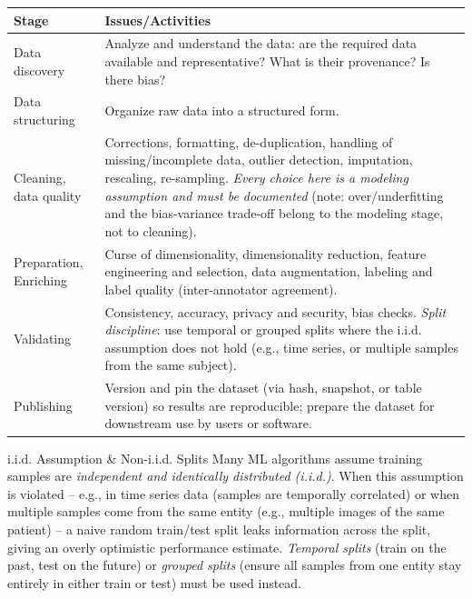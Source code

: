 \begin{center}
\begin{tabular}{p{3.6cm}p{9.4cm}}
\toprule
\textbf{Stage} & \textbf{Issues/Activities} \\
\midrule
Data discovery & Analyze and understand the data: are the required data available and representative? What is their provenance? Is there bias? \\[0.15cm]
Data structuring & Organize raw data into a structured form. \\[0.15cm]
Cleaning, data quality & Corrections, formatting, de-duplication, handling of missing/incomplete data, outlier detection, imputation, rescaling, re-sampling. \emph{Every choice here is a modeling assumption and must be documented} (note: over/underfitting and the bias-variance trade-off belong to the modeling stage, not to cleaning). \\[0.15cm]
Preparation, Enriching & Curse of dimensionality, dimensionality reduction, feature engineering and selection, data augmentation, labeling and label quality (inter-annotator agreement). \\[0.15cm]
Validating & Consistency, accuracy, privacy and security, bias checks. \emph{Split discipline}: use temporal or grouped splits where the i.i.d. assumption does not hold (e.g., time series, or multiple samples from the same subject). \\[0.15cm]
Publishing & Version and pin the dataset (via hash, snapshot, or table version) so results are reproducible; prepare the dataset for downstream use by users or software. \\
\bottomrule
\end{tabular}
\end{center}

\begin{defbox}{i.i.d. Assumption \& Non-i.i.d. Splits}
Many ML algorithms assume training samples are \emph{independent and identically distributed (i.i.d.)}. When this assumption is violated -- e.g., in time series data (samples are temporally correlated) or when multiple samples come from the same entity (e.g., multiple images of the same patient) -- a naive random train/test split leaks information across the split, giving an overly optimistic performance estimate. \emph{Temporal splits} (train on the past, test on the future) or \emph{grouped splits} (ensure all samples from one entity stay entirely in either train or test) must be used instead.
\end{defbox}

